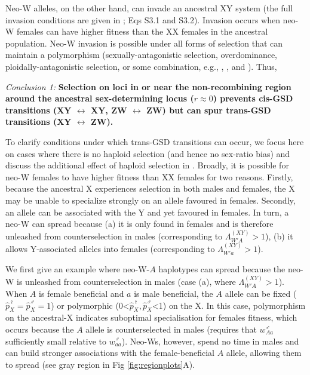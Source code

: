 \documentclass[10pt,letterpaper]{article}
\begin{document}
Neo-W alleles, on the other hand, can invade an ancestral XY system (the full invasion conditions are given in ; Eqs S3.1 and S3.2).
Invasion occurs when neo-W females can have higher fitness than the XX females in the ancestral population.
Neo-W invasion is possible under all forms of selection that can maintain a polymorphism (sexually-antagonistic selection, overdominance, ploidally-antagonistic selection, or some combination, e.g., , , and ). Thus, 
\vspace{0.5cm}

\noindent\textit{Conclusion 1:}
\textbf{Selection on loci in or near the non-recombining region around the ancestral sex-determining locus ($r\approx0$) prevents cis-GSD transitions (XY $\leftrightarrow$ XY, ZW $\leftrightarrow$ ZW) but can spur trans-GSD transitions (XY $\leftrightarrow$ ZW).}
\vspace{0.5cm}

\noindent 
To clarify conditions under which trans-GSD transitions can occur, we focus here on cases where there is no haploid selection (and hence no sex-ratio bias) and discuss the additional effect of haploid selection in . 
Broadly, it is possible for neo-W females to have higher fitness than XX females for two reasons.
Firstly, because the ancestral X experiences selection in both males and females, the X may be unable to specialize strongly on an allele favoured in females.
Secondly, an allele can be associated with the Y and yet favoured in females.
In turn, a neo-W can spread because (a) it is only found in females and is therefore unleashed from counterselection in males (corresponding to $\Lambda_{W'A}^{(XY)}>1$), (b) it allows Y-associated alleles into females (corresponding to $\Lambda_{W'a}^{(XY)}>1$).

We first give an example where neo-W-$A$ haplotypes can spread because the neo-W is unleashed from counterselection in males (case (a), where $\Lambda_{W'A}^{(XY)}>1$).
When $A$ is female beneficial and $a$ is male beneficial, the $A$ allele can be fixed ($\hat{p}^\female_X=\hat{p}^\male_X=1$) or polymorphic (0<$\hat{p}^\female_X, \hat{p}^\male_X$<1) on the X. 
In this case, polymorphism on the ancestral-X indicates suboptimal specialisation for females fitness, which occurs because the $A$ allele is counterselected in males (requires that $w^\male_{Aa}$  sufficiently small relative to $w^\male_{aa}$). 
Neo-Ws, however, spend no time in males and can build stronger associations with the female-beneficial $A$ allele, allowing them to spread (see gray region in Fig \ref{fig:regionplots}A).
\end{document}
